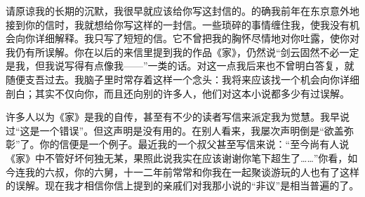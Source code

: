 \par 请原谅我的长期的沉默，我很早就应该给你写这封信的。的确我前年在东京意外地接到你的信时，我就想给你写这样的一封信。一些琐碎的事情缠住我，使我没有机会向你详细解释。我只写了短短的信。它不曾把我的胸怀尽情地对你吐露，使你对我仍有所误解。你在以后的来信里提到我的作品《家》，仍然说“剑云固然不必一定是我，但我说写得有点像我——”一类的话。对这一点我后来也不曾明白答复，就随便支吾过去。我脑子里时常存着这样一个念头：我将来应该找一个机会向你详细剖白；其实不仅向你，而且还向别的许多人，他们对这本小说都多少有过误解。
\par 许多人以为《家》是我的自传，甚至有不少的读者写信来派定我为觉慧。我早说过“这是一个错误”。但这声明是没有用的。在别人看来，我屡次声明倒是“欲盖弥彰”了。你的信便是一个例子。最近我的一个叔父甚至写信来说：“至今尚有人说《家》中不管好坏何独无某，果照此说我实在应该谢谢你笔下超生了……”你看，如今连我的六叔，你的六舅，十一二年前常常和你我在一起聚谈游玩的人也有了这样的误解。现在我才相信你信上提到的亲戚们对我那小说的“非议”是相当普遍的了。
